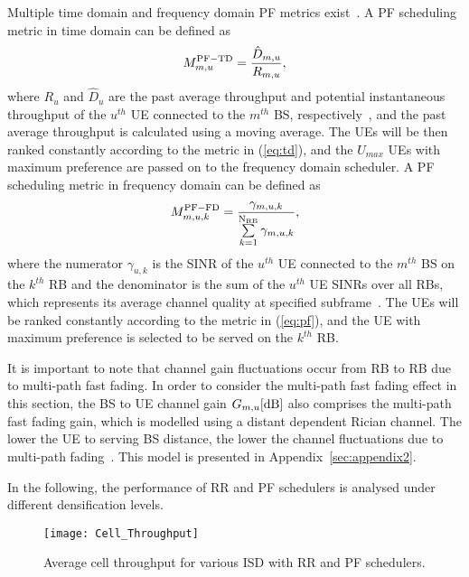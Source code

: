 \documentclass{IEEEtran}
\begin{document}
Multiple time domain and frequency domain \ac{PF} metrics exist~\cite{4526113}.
A \ac{PF} scheduling metric in time domain can be defined as
\begin{equation}
	M_{m,u}^{\rm PF-TD} = \frac{\hat{D}_{m,u}}{R_{m,u}},
	\label{eq:td}
\end{equation}
where $R_u$ and $\hat{D}_u$ are the past average throughput and potential instantaneous throughput of the $u^{th}$ \ac{UE} connected to the $m^{th}$ \ac{BS}, respectively~\cite{4526113},
and the past average throughput is calculated using a moving average.
The \acp{UE} will be then ranked constantly according to the metric in (\ref{eq:td}),
and the $U_{max}$ \acp{UE} with maximum preference are passed on to the frequency domain scheduler.
A \ac{PF} scheduling metric in frequency domain can be defined as
\begin{equation}
	M_{m,u,k}^{\rm PF-FD} = \frac{{\gamma}_{m,u,k}}{\sum\limits_{k = 1}^{\rm N_{RB}} {\gamma}_{m,u,k}},
	\label{eq:pf}
\end{equation}
where the numerator ${\gamma}_{u,k}$ is the \ac{SINR} of the $u^{th}$ \ac{UE} connected to the $m^{th}$ \ac{BS} on the $k^{th}$ \ac{RB}
and the denominator is the sum of the $u^{th}$ UE SINRs over all \acp{RB},
which represents its average channel quality at specified subframe~\cite{4526113}.
The \acp{UE} will be ranked constantly according to the metric in (\ref{eq:pf}),
and the \ac{UE} with maximum preference is selected to be served on the $k^{th}$ \ac{RB}.

It is important to note that channel gain fluctuations occur from \ac{RB} to \ac{RB} due to multi-path fast fading.
In order to consider the multi-path fast fading effect in this section,
the \ac{BS} to \ac{UE} channel gain  $G_{m,u} {\rm [dB]}$ also comprises the multi-path fast fading gain,
which is modelled using a distant dependent Rician channel.
The lower the \ac{UE} to serving \ac{BS} distance,
the lower the channel fluctuations due to multi-path fading~\cite{2015Jafari}.
This model is presented in Appendix~\ref{sec:appendix2}.


In the following, the performance of \ac{RR} and \ac{PF} schedulers is analysed under different densification levels.

\begin{figure}[t]
	\centering
	\texttt{[image: Cell\_Throughput]}
	\caption{Average cell throughput for various \ac{ISD} with \ac{RR} and \ac{PF} schedulers.}
	\label{fig:cell_ov_thr}
\end{figure}
\end{document}
